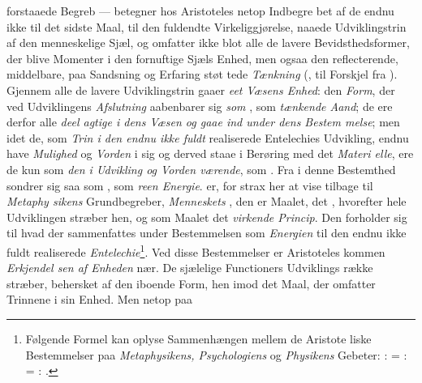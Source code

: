 forstaaede Begreb --- betegner hos Aristoteles netop Indbegre\-%
bet af de endnu ikke til det sidste Maal, til den fuldendte
Virkeliggjørelse, naaede Udviklingstrin af den menneskelige
Sjæl, og omfatter ikke blot alle de lavere Bevidsthedsformer,
der blive Momenter i den fornuftige Sjæls Enhed, men ogsaa
den reflecterende, middelbare, paa Sandsning og Erfaring støt\-%
tede \emph{Tænkning} (, til Forskjel fra ). Gjennem
alle de lavere Udviklingstrin gaaer \emph{eet Væsens Enhed}:
den \emph{Form}, der ved Udviklingens \emph{Afslutning} aabenbarer sig
\emph{som} , som \emph{tænkende Aand}; de ere derfor alle \emph{deel\-%
\setcounter{footnote}{0}%
agtige i dens Væsen og gaae ind under dens Bestem\-%
melse}; men idet de, som \emph{Trin i den endnu ikke fuldt}
realiserede Entelechies Udvikling, endnu have \emph{Mulighed} og
\emph{Vorden} i sig og derved staae i Berøring med det \emph{Materi\-%
elle}, ere de kun  som \emph{den i Udvikling og Vorden
værende}, som \emph{}. Fra  i denne Bestemthed
sondrer sig saa  som \emph{}, som \emph{reen Energie}.
 er, for strax her at vise tilbage til \emph{Metaphy\-%
sikens} Grundbegreber, \emph{Menneskets} , den er Maalet,
det \emph{}, hvorefter hele Udviklingen stræber hen, og som
Maalet det \emph{virkende Princip}. Den forholder sig til hvad
der sammenfattes under Bestemmelsen  som
\emph{Energien} til den endnu ikke fuldt realiserede \emph{Entelechie}\footnote{Følgende
  Formel kan oplyse Sammenhængen mellem de Aristote\-%
liske Bestemmelser paa \emph{Metaphysikens, Psychologiens} og
  \emph{Physikens} Gebeter: :  = :  =
  : .}.
Ved disse Bestemmelser er Aristoteles kommen \emph{Erkjendel\-%
sen af Enheden} nær. De sjælelige Functioners Udviklings\-%
række stræber, behersket af den iboende Form, hen imod det
Maal, der omfatter Trinnene i sin Enhed. Men netop paa

